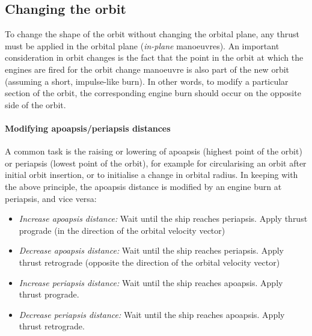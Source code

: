 \documentclass[Orbiter User Manual.tex]{subfiles}
\begin{document}


\subsection{Changing the orbit}
\label{ssec:basic_changeorbit}
To change the shape of the orbit without changing the orbital plane, any thrust
must be applied in the orbital plane (\emph{in-plane} manoeuvres). An important
consideration in orbit changes is the fact that the point in the orbit at which
the engines are fired for the orbit change manoeuvre is also part of the new
orbit (assuming a short, impulse-like burn). In other words, to modify a
particular section of the orbit, the corresponding engine burn should occur on
the opposite side of the orbit.

\paragraph{Modifying apoapsis/periapsis distances}
A common task is the raising or lowering of apoapsis (highest point of the
orbit) or periapsis (lowest point of the orbit), for example for circularising
an orbit after initial orbit insertion, or to initialise a change in orbital
radius. In keeping with the above principle, the apoapsis distance is modified
by an engine burn at periapsis, and vice versa:

\begin{itemize}
	\item \emph{Increase apoapsis distance:} Wait until the ship reaches
		periapsis. Apply thrust prograde (in the direction of the orbital
		velocity vector)
	\item \emph{Decrease apoapsis distance:} Wait until the ship reaches
		periapsis. Apply thrust retrograde (opposite the direction of the
		orbital velocity vector)
	\item \emph{Increase periapsis distance:} Wait until the ship reaches
		apoapsis. Apply thrust prograde.
	\item \emph{Decrease periapsis distance:} Wait until the ship reaches
		apoapsis. Apply thrust retrograde.
\end{itemize}
\end{document}
